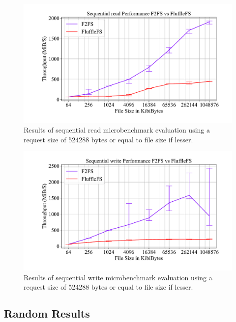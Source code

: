 \begin{figure}[h]
    \centering
	\includegraphics[width=1\textwidth]{resources/images/results-sequential.pdf}
	\caption{Results of sequential read microbenchmark evaluation using a request
        size of 524288 bytes or equal to file size if lesser.}
    \label{figure:readsequential}
\end{figure}

\begin{figure}[h]
    \centering
	\includegraphics[width=1\textwidth]{resources/images/results-sequential-write.pdf}
	\caption{Results of sequential write microbenchmark evaluation using a request
        size of 524288 bytes or equal to file size if lesser.}
    \label{figure:writesequential}
\end{figure}

\subsection{Random Results}

